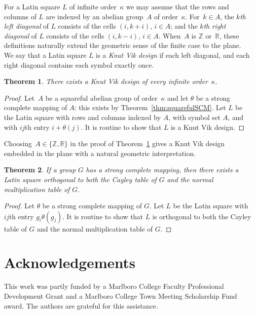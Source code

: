 \documentclass[12pt,a4paper]{article}
\newtheorem{thm}{Theorem}[section]
\newcommand{\Z}{\mathbb{Z}}
\newcommand{\R}{\mathbb{R}}
\begin{document}
For a Latin square $L$ of infinite order~$\kappa$ we may assume that the rows and columns of $L$ are indexed by an abelian group~$A$ of order~$\kappa$.  For~$k \in A$, the {\em $k$th left diagonal} of $L$ consists of the cells $(i,k+i)$, $i\in A$; and the {\em $k$th right diagonal} of $L$ consists of the cells $(i,k-i)$, $i\in A$.  When~$A$ is $\Z$ or~$\R$, these definitions naturally extend the geometric sense of the finite case to the plane.   We say that a Latin square $L$ is a {\em Knut Vik design} if each left diagonal, and each right diagonal contains each symbol exactly once.  

\begin{thm}\label{th:infKV}
There exists a Knut Vik design of every infinite order~$\kappa$.
\end{thm}
\begin{proof}
Let~$A$ be a squareful abelian group of order~$\kappa$ and let $\theta$ be a strong complete mapping of $A$: this exists by Theorem~\ref{thm:squarefulSCM}. Let $L$ be the Latin square with rows and columns indexed by $A$, with symbol set $A$, and with $ij$th entry $i+\theta(j)$. It is routine to show that $L$ is a Knut Vik design.
\end{proof}

Choosing~$A \in \{ \Z, \R \}$ in the proof of Theorem~\ref{th:infKV} gives a Knut Vik design embedded in the plane with a natural geometric interpretation.


\begin{thm}
If a group $G$ has a strong complete mapping, then there exists a Latin square orthogonal to both the Cayley table of $G$ and the normal multiplication table of $G$.
\end{thm}
\begin{proof}
Let $\theta$ be a strong complete mapping of $G$. Let $L$ be the Latin square with $ij$th entry $g_i\theta(g_j)$. It is routine to show that $L$ is orthogonal to both the Cayley table of $G$ and the normal multiplication table of $G$.
\end{proof}


\section*{Acknowledgements}

This work was partly funded by a Marlboro College Faculty Professional Development Grant and a Marlboro College Town Meeting Scholarship Fund award.  The authors are grateful for this assistance.
\end{document}
